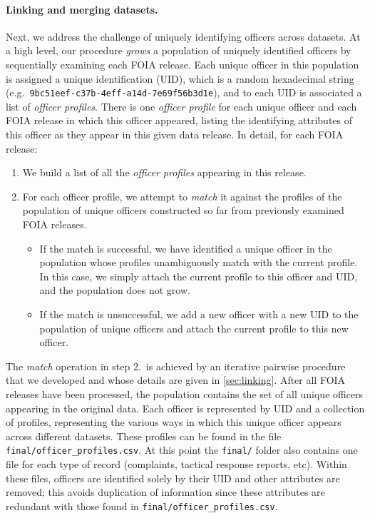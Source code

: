 \paragraph{Linking and merging datasets.}
Next, we address the challenge of uniquely identifying officers across datasets.
At a high level, our procedure \emph{grows} a population of uniquely identified
officers by sequentially examining each FOIA release. Each unique officer in
this population is assigned a unique identification (UID), which is a random hexadecimal string (e.g.\
\texttt{9bc51eef-c37b-4eff-a14d-7e69f56b3d1e}), and to each UID is associated
a list of \emph{officer profiles}. There is one \emph{officer profile} for each
unique officer and each FOIA release in which this officer appeared, listing
the identifying attributes of this officer as they appear in this given data
release. In detail, for each FOIA release:
\begin{enumerate}
	\item We build a list of all the \emph{officer profiles} appearing in this
		release.
	\item For each officer profile, we attempt to \emph{match} it against the
		profiles of the population of unique officers constructed so far from
		previously examined FOIA releases.
		\begin{itemize}
			\item If the match is successful, we have identified a unique officer in
				the population whose profiles unambiguously match with the
				current profile. In this case, we simply attach the current
				profile to this officer and UID, and
				the population does not grow.
			\item If the match is unsuccessful, we add a new officer with a new UID to the population of unique
				officers and attach the current profile to this new officer.
		\end{itemize}
\end{enumerate}

The \emph{match} operation in step 2.\ is achieved by an iterative pairwise
procedure that we developed and whose details are given  in \cref{sec:linking}.
After all FOIA releases have been processed, the population contains the set of
all unique officers appearing in the original data. Each officer is represented
by UID and a collection of profiles, representing the various ways in which
this unique officer appears across different datasets. These profiles can be
found in the file \texttt{final/officer\_profiles.csv}.
At this point the \texttt{final/} folder also contains
one file for each type of record (complaints, tactical response reports, etc).
Within these files, officers are identified solely by their UID and other attributes
are removed; this avoids duplication of
information since these attributes are redundant with those found in
\texttt{final/officer\_profiles.csv}.

